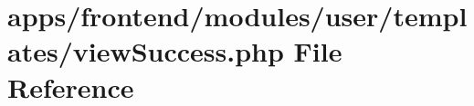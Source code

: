 \hypertarget{frontend_2modules_2user_2templates_2view_success_8php}{\section{apps/frontend/modules/user/templates/view\-Success.php File Reference}
\label{frontend_2modules_2user_2templates_2view_success_8php}
}
